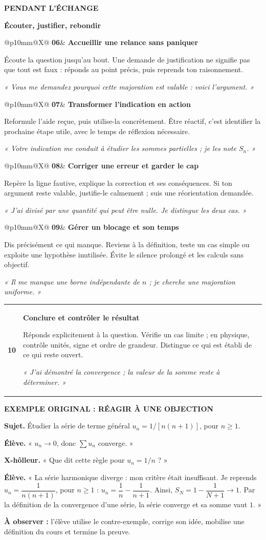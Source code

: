 \documentclass[11pt,a4paper]{article}
\makeatletter
\newcommand{\repere}[4]{%
  \begin{minipage}{\linewidth}
  \begin{tabularx}{\linewidth}{@{}p{10mm}@{\hspace{3mm}}X@{}}
  {\sffamily\bfseries\fontsize{20}{22}\selectfont\color{teal}#1}&
  {\sffamily\bfseries\large\color{ink}#2}\par\vspace{2mm}
  #3\par\vspace{1mm}
  {\small\color{teal}\textit{#4}}
  \end{tabularx}
  \end{minipage}\par\vspace{4.3mm}}
\newcommand{\bandeau}[2]{%
  \begingroup\setlength{\fboxsep}{4mm}%
  \colorbox{wash}{\parbox{\dimexpr\linewidth-8mm\relax}{%
  {\sffamily\bfseries\color{ink}#1}\par\vspace{2mm}#2}}%
  \endgroup}
\makeatother
\begin{document}
\newpage
{\sffamily\bfseries\small\color{teal}PENDANT L'ÉCHANGE}\par
\vspace{3mm}
{\sffamily\bfseries\fontsize{23}{26}\selectfont Écouter, justifier, rebondir}\par
\vspace{4.5mm}

\repere{06}{Accueillir une relance sans paniquer}
{Écoute la question jusqu'au bout. Une demande de justification ne signifie pas que tout est faux : réponds au point précis, puis reprends ton raisonnement.}
{« Vous me demandez pourquoi cette majoration est valable : voici l'argument. »}

\repere{07}{Transformer l'indication en action}
{Reformule l'aide reçue, puis utilise-la concrètement. Être réactif, c'est identifier la prochaine étape utile, avec le temps de réflexion nécessaire.}
{« Votre indication me conduit à étudier les sommes partielles ; je les note $S_n$. »}

\repere{08}{Corriger une erreur et garder le cap}
{Repère la ligne fautive, explique la correction et ses conséquences. Si ton argument reste valable, justifie-le calmement ; suis une réorientation demandée.}
{« J'ai divisé par une quantité qui peut être nulle. Je distingue les deux cas. »}

\repere{09}{Gérer un blocage et son temps}
{Dis précisément ce qui manque. Reviens à la définition, teste un cas simple ou exploite une hypothèse inutilisée. Évite le silence prolongé et les calculs sans objectif.}
{« Il me manque une borne indépendante de $n$ ; je cherche une majoration uniforme. »}

\repere{10}{Conclure et contrôler le résultat}
{Réponds explicitement à la question. Vérifie un cas limite ; en physique, contrôle unités, signe et ordre de grandeur. Distingue ce qui est établi de ce qui reste ouvert.}
{« J'ai démontré la convergence ; la valeur de la somme reste à déterminer. »}

\bandeau{EXEMPLE ORIGINAL : RÉAGIR À UNE OBJECTION}{%
\small
\textbf{Sujet.} Étudier la série de terme général $u_n=1/[n(n+1)]$, pour $n\geq1$.\par
\textbf{Élève.} « $u_n\to 0$, donc $\sum u_n$ converge. »\par
\textbf{X-hôlleur.} « Que dit cette règle pour $u_n=1/n$ ? »\par
\textbf{Élève.} « La série harmonique diverge : mon critère était insuffisant.
Je reprends $u_n=\dfrac{1}{n(n+1)}$, pour $n\geq1$ :
$u_n=\dfrac1n-\dfrac1{n+1}$. Ainsi,
$S_N=1-\dfrac1{N+1}\to1$. Par la définition de la convergence d'une série,
la série converge et sa somme vaut $1$. »\par\vspace{1mm}
\textbf{À observer :} l'élève utilise le contre-exemple, corrige son idée,
mobilise une définition du cours et termine la preuve.}
\end{document}
